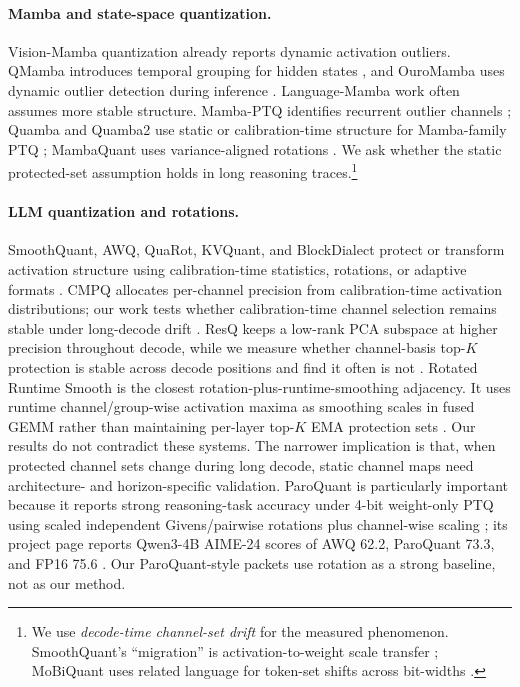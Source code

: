 \documentclass{article}
\begin{document}
\paragraph{Mamba and state-space quantization.} Vision-Mamba quantization already reports dynamic activation outliers. QMamba introduces temporal grouping for hidden states \citep{li2025qmamba}, and OuroMamba uses dynamic outlier detection during inference \citep{ramachandran2025ouromamba}. Language-Mamba work often assumes more stable structure. Mamba-PTQ identifies recurrent outlier channels \citep{pierro2024mambaptq}; Quamba and Quamba2 use static or calibration-time structure for Mamba-family PTQ \citep{chiang2024quamba,chiang2025quamba2}; MambaQuant uses variance-aligned rotations \citep{xu2025mambaquant}. We ask whether the static protected-set assumption holds in long reasoning traces.\footnote{We use \emph{decode-time channel-set drift} for the measured phenomenon. SmoothQuant's ``migration'' is activation-to-weight scale transfer \citep{xiao2023smoothquant}; MoBiQuant uses related language for token-set shifts across bit-widths \citep{wang2026mobiquant}.}

\paragraph{LLM quantization and rotations.} SmoothQuant, AWQ, QuaRot, KVQuant, and BlockDialect protect or transform activation structure using calibration-time statistics, rotations, or adaptive formats \citep{xiao2023smoothquant,lin2023awq,ashkboos2024quarot,hooper2024kvquant,jang2025blockdialect}. CMPQ allocates per-channel precision from calibration-time activation distributions; our work tests whether calibration-time channel selection remains stable under long-decode drift \citep{chen2025cmpq}. ResQ keeps a low-rank PCA subspace at higher precision throughout decode, while we measure whether channel-basis top-$K$ protection is stable across decode positions and find it often is not \citep{saxena2025resq}. Rotated Runtime Smooth is the closest rotation-plus-runtime-smoothing adjacency. It uses runtime channel/group-wise activation maxima as smoothing scales in fused GEMM rather than maintaining per-layer top-$K$ EMA protection sets \citep{yi2024rrs}. Our results do not contradict these systems. The narrower implication is that, when protected channel sets change during long decode, static channel maps need architecture- and horizon-specific validation. ParoQuant is particularly important because it reports strong reasoning-task accuracy under 4-bit weight-only PTQ using scaled independent Givens/pairwise rotations plus channel-wise scaling \citep{liang2026paroquant}; its project page reports Qwen3-4B AIME-24 scores of AWQ 62.2, ParoQuant 73.3, and FP16 75.6 \citep{zlab2026paroquantproject}. Our ParoQuant-style packets use rotation as a strong baseline, not as our method.
\end{document}
